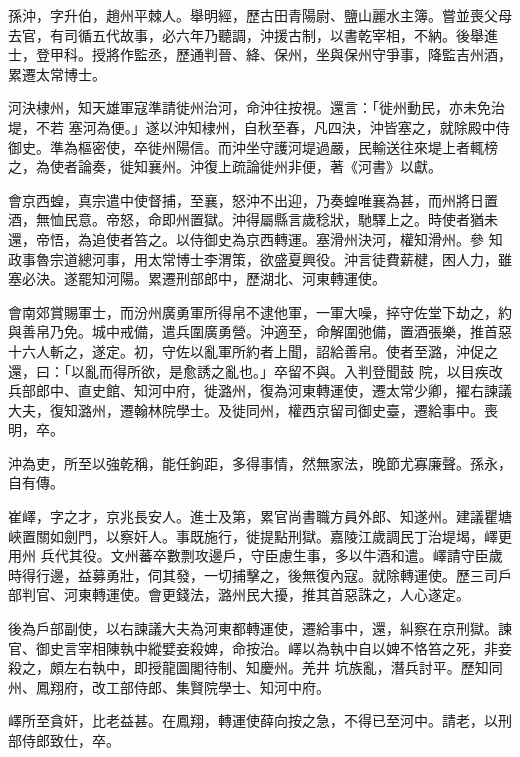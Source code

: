 \begin{pinyinscope}
 孫沖，字升伯，趙州平棘人。舉明經，歷古田青陽尉、鹽山麗水主簿。嘗並喪父母去官，有司循五代故事，必六年乃聽調，沖援古制，以書乾宰相，不納。後舉進士，登甲科。授將作監丞，歷通判晉、絳、保州，坐與保州守爭事，降監吉州酒，累遷太常博士。



 河決棣州，知天雄軍寇準請徙州治河，命沖往按視。還言：「徙州動民，亦未免治堤，不若
 塞河為便。」遂以沖知棣州，自秋至春，凡四決，沖皆塞之，就除殿中侍御史。準為樞密使，卒徙州陽信。而沖坐守護河堤過嚴，民輸送往來堤上者輒榜之，為使者論奏，徙知襄州。沖復上疏論徙州非便，著《河書》以獻。



 會京西蝗，真宗遣中使督捕，至襄，怒沖不出迎，乃奏蝗唯襄為甚，而州將日置酒，無恤民意。帝怒，命即州置獄。沖得屬縣言歲稔狀，馳驛上之。時使者猶未還，帝悟，為追使者笞之。以侍御史為京西轉運。塞滑州決河，權知滑州。參
 知政事魯宗道總河事，用太常博士李渭策，欲盛夏興役。沖言徒費薪楗，困人力，雖塞必決。遂罷知河陽。累遷刑部郎中，歷湖北、河東轉運使。



 會南郊賞賜軍士，而汾州廣勇軍所得帛不逮他軍，一軍大噪，捽守佐堂下劫之，約與善帛乃免。城中戒備，遣兵圍廣勇營。沖適至，命解圍弛備，置酒張樂，推首惡十六人斬之，遂定。初，守佐以亂軍所約者上聞，詔給善帛。使者至潞，沖促之還，曰：「以亂而得所欲，是愈誘之亂也。」卒留不與。入判登聞鼓
 院，以目疾改兵部郎中、直史館、知河中府，徙潞州，復為河東轉運使，遷太常少卿，擢右諫議大夫，復知潞州，遷翰林院學士。及徙同州，權西京留司御史臺，遷給事中。喪明，卒。



 沖為吏，所至以強乾稱，能任鉤距，多得事情，然無家法，晚節尤寡廉聲。孫永，自有傳。



 崔嶧，字之才，京兆長安人。進士及第，累官尚書職方員外郎、知遂州。建議瞿塘峽置關如劍門，以察奸人。事既施行，徙提點刑獄。嘉陵江歲調民丁治堤堨，嶧更用州
 兵代其役。文州蕃卒數剽攻邊戶，守臣慮生事，多以牛酒和遣。嶧請守臣歲時得行邊，益募勇壯，伺其發，一切捕擊之，後無復內寇。就除轉運使。歷三司戶部判官、河東轉運使。會更錢法，潞州民大擾，推其首惡誅之，人心遂定。



 後為戶部副使，以右諫議大夫為河東都轉運使，遷給事中，還，糾察在京刑獄。諫官、御史言宰相陳執中縱嬖妾殺婢，命按治。嶧以為執中自以婢不恪笞之死，非妾殺之，頗左右執中，即授龍圖閣待制、知慶州。羌井
 坑族亂，潛兵討平。歷知同州、鳳翔府，改工部侍郎、集賢院學士、知河中府。



 嶧所至貪奸，比老益甚。在鳳翔，轉運使薛向按之急，不得已至河中。請老，以刑部侍郎致仕，卒。




\end{pinyinscope}
